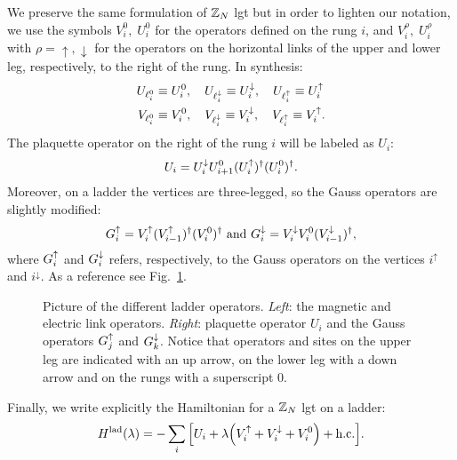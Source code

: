 We preserve the same formulation of $\Z_N$ \ac{lgt} but in order to lighten our notation,
we use the symbols $V^0_i, \; U^0_i$ for the operators defined on the rung $i$, and  $V^{\rho}_i, \; U^{\rho}_i$ with $\rho = \uparrow, \downarrow$ for the operators on the horizontal links of the upper and lower leg, respectively, to the right of the rung.
In synthesis:
\begin{equation}
    \begin{split}
        U_{\ell^0_i} & \equiv U^0_i, \quad
        U_{\ell^\downarrow_i}   \equiv U^{\downarrow}_i, \quad
        U_{\ell^\uparrow_i}   \equiv U^{\uparrow}_i \\
        V_{\ell^0_i} & \equiv V^0_i, \quad
        V_{\ell^\downarrow_i}   \equiv V^{\downarrow}_i, \quad
        V_{\ell^\uparrow_i}   \equiv V^{\uparrow}_i.
    \end{split}
\end{equation}
The plaquette operator on the right of the rung $i$ will be labeled as $U_i$:
\begin{equation}
    U_i = U^{\downarrow}_i U^0_{i+1} (U^{\uparrow}_i)^{\dagger} (U^0_i)^{\dagger}.
    \label{eq:plaq_op_ladder}
\end{equation}
Moreover, on a ladder the vertices are three-legged, so the Gauss operators are slightly modified:
\begin{equation}
    G^{\uparrow}_i
    = V^{\uparrow}_i ( V^{\uparrow}_{i-1} )^\dagger ( V^0_i )^\dagger \text{~and~}
    G^{\downarrow}_i
    = V^{\downarrow}_i V^0_i ( V^{\downarrow}_{i-1} )^\dagger,
    \label{eq:gauss_law_ladder}
\end{equation}
where $G^{\uparrow}_i$ and $G^{\downarrow}_i$ refers, respectively, to the Gauss operators on the vertices $i^{\uparrow}$ and $i^{\downarrow}$.
As a reference see Fig.~\ref{fig:ladder_operators}.

\begin{figure}
    \centering
    
    \caption[Operators of a $\Z_N$ ladder \ac{lgt}]{%
        Picture of the different ladder operators.
        \emph{Left}: the magnetic and electric link operators.
        \emph{Right}: plaquette operator $U_i$ and the Gauss operators $G^{\uparrow}_j$ and $G^{\downarrow}_k$.
        Notice that operators and sites on the upper leg are indicated with an up arrow, on the lower leg with a down arrow and on the rungs with a superscript $0$.
    }
    \label{fig:ladder_operators}
\end{figure}


Finally, we write explicitly the Hamiltonian for a $\Z_N$ \ac{lgt} on a ladder:
\begin{equation}
    \HamilLadder(\lambda) =
    - \sum_{i} \bqty{ U_i + \lambda \pqty{ \Vup_i + \Vdown_i + V^0_i } + \text{h.c.} }.
    \label{eq:ladder_hamiltonian}
\end{equation}


